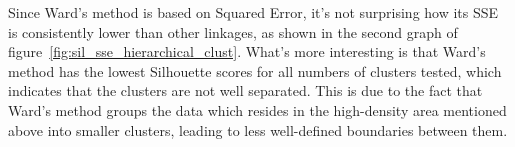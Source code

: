 Since Ward's method is based on Squared Error, it's not surprising how its SSE is consistently lower than other linkages, as shown in the second graph of figure~\ref{fig:sil_sse_hierarchical_clust}.
What's more interesting is that Ward's method has the lowest Silhouette scores for all numbers
of clusters tested, which indicates that the clusters are not well separated. This is due to
the fact that Ward's method groups the data which resides in the high-density area
mentioned above into smaller clusters, leading to less well-defined boundaries between them.

